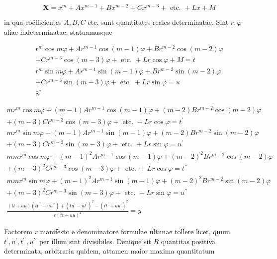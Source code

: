 \documentclass[10pt]{article}
\begin{document}
\[
\mathbf{X}=x^{m}+A x^{m-1}+B x^{m-2}+C x^{m-3}+\text { etc. }+L x+M
\]

in qua coëfficientes \(A, B, C\) etc. sunt quantitates reales determinatae. Sint \(r, \varphi\) aliae indeterminatae, statuamusque

\[
\begin{gathered}
r^{m} \cos m \varphi+A r^{m-1} \cos (m-1) \varphi+B r^{m-2} \cos (m-2) \varphi \\
+C r^{m-3} \cos (m-3) \varphi+\text { etc. }+L r \cos \varphi+M=t \\
r^{m} \sin m \varphi+A r^{m-1} \sin (m-1) \varphi+B r^{m-2} \sin (m-2) \varphi \\
+C r^{m-3} \sin (m-3) \varphi+\text { etc. }+L r \sin \varphi=u \\
8^{*}
\end{gathered}
\]

\[
\begin{gathered}
m r^{m} \cos m \varphi+(m-1) A r^{m-1} \cos (m-1) \varphi+(m-2) B r^{m-2} \cos (m-2) \varphi \\
+(m-3) C r^{m-3} \cos (m-3) \varphi+\text { etc. }+L r \cos \varphi=t^{\prime} \\
m r^{m} \sin m \varphi+(m-1) A r^{m-1} \sin (m-1) \varphi+(m-2) B r^{m-2} \sin (m-2) \varphi \\
+(m-3) C r^{m-3} \sin (m-3) \varphi+\text { etc. }+L r \sin \varphi=u^{\prime} \\
m m r^{m} \cos m \varphi+(m-1)^{2} A r^{m-1} \cos (m-1) \varphi+(m-2)^{2} B r^{m-2} \cos (m-2) \varphi \\
+(m-3)^{2} C r^{m-3} \cos (m-3) \varphi+\text { etc. }+L r \cos \varphi=t^{\prime \prime} \\
m m r^{m} \sin m \varphi+(m-1)^{2} A r^{m-1} \sin (m-1) \varphi+(m-2)^{2} B r^{m-2} \sin (m-2) \varphi \\
+(m-3)^{2} C r^{m-3} \sin (m-3) \varphi+\text { etc. }+L r \sin \varphi=u^{\prime \prime} \\
\frac{(t t+u u)\left(t t^{\prime \prime}+u u^{\prime \prime}\right)+\left(t u^{\prime}-u t^{\prime}\right)^{2}-\left(t t^{\prime}+u u^{\prime}\right)^{2}}{r(t t+u u)^{2}}=y
\end{gathered}
\]

Factorem \(r\) manifesto e denominatore formulae ultimae tollere licet, quum \(t^{\prime}, u^{\prime}, t^{\prime \prime}, u^{\prime \prime}\) per illum sint divisibiles. Denique sit \(R\) quantitas positiva determinata, arbitraria quidem, attamen maior maxima quantitatum
\end{document}
